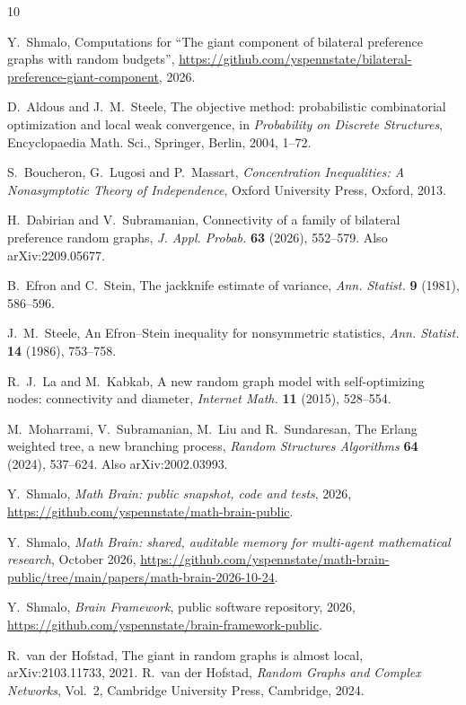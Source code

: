 \documentclass[11pt]{amsart}
\theoremstyle{remark}
\numberwithin{equation}{section}
\newcommand{\1}{\mathbf 1}
\begin{document}
\begin{thebibliography}{10}

Y.~Shmalo, Computations for ``The giant component of bilateral preference graphs with random budgets'', \url{https://github.com/yspennstate/bilateral-preference-giant-component}, 2026.

D.~Aldous and J.~M.~Steele, The objective method: probabilistic combinatorial optimization and local weak convergence, in \emph{Probability on Discrete Structures}, Encyclopaedia Math. Sci., Springer, Berlin, 2004, 1--72.

S.~Boucheron, G.~Lugosi and P.~Massart, \emph{Concentration Inequalities: A Nonasymptotic Theory of Independence}, Oxford University Press, Oxford, 2013.

H.~Dabirian and V.~Subramanian, Connectivity of a family of bilateral preference random graphs, \emph{J. Appl. Probab.} \textbf{63} (2026), 552--579. Also arXiv:2209.05677.

B.~Efron and C.~Stein, The jackknife estimate of variance, \emph{Ann. Statist.} \textbf{9} (1981), 586--596.

J.~M.~Steele, An Efron--Stein inequality for nonsymmetric statistics, \emph{Ann. Statist.} \textbf{14} (1986), 753--758.

R.~J.~La and M.~Kabkab, A new random graph model with self-optimizing nodes: connectivity and diameter, \emph{Internet Math.} \textbf{11} (2015), 528--554.

M.~Moharrami, V.~Subramanian, M.~Liu and R.~Sundaresan, The Erlang weighted tree, a new branching process, \emph{Random Structures Algorithms} \textbf{64} (2024), 537--624. Also arXiv:2002.03993.

 Y.~Shmalo, \emph{Math Brain: public snapshot, code and tests}, 2026, \url{https://github.com/yspennstate/math-brain-public}.

 Y.~Shmalo, \emph{Math Brain: shared, auditable memory for multi-agent mathematical research}, October 2026, \url{https://github.com/yspennstate/math-brain-public/tree/main/papers/math-brain-2026-10-24}.

 Y.~Shmalo, \emph{Brain Framework}, public software repository, 2026, \url{https://github.com/yspennstate/brain-framework-public}.

R.~van der Hofstad, The giant in random graphs is almost local, arXiv:2103.11733, 2021.
R.~van der Hofstad, \emph{Random Graphs and Complex Networks}, Vol.~2, Cambridge University Press, Cambridge, 2024.
\end{thebibliography}
\end{document}
